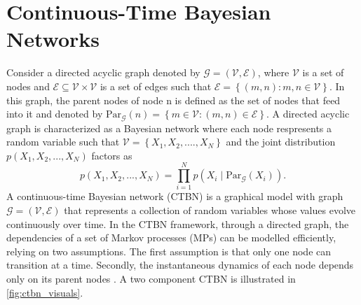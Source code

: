 \section{Continuous-Time Bayesian Networks}
\label{sec:ctbn_intro}
Consider a directed acyclic graph denoted by $ \mathcal{G} = \left( \mathcal{V}, \mathcal{E}\right) $, where $ \mathcal{V} $ is a set of nodes and $ \mathcal{E} \subseteq \mathcal{V} \times \mathcal{V} $ is a set of edges such that $ \mathcal{E} = \left\lbrace \left( m, n\right) : m, n \in \mathcal{V} \right\rbrace $. In this graph, the parent nodes of node n is defined as the set of nodes that feed into it and denoted by $ \mathrm{Par}_{\mathcal{G}}(n) = \left\lbrace m \in \mathcal{V} : \left( m, n \right) \in \mathcal{E} \right\rbrace $. A directed acyclic graph is characterized as a Bayesian network where each node respresents a random variable such that $ \mathcal{V} = \left\lbrace X_1, X_2, ...., X_N\right\rbrace  $ and the joint distribution $ p(X_1, X_2, ..., X_N) $ factors as 
\begin{equation}
p(X_1, X_2, ..., X_N) = \prod_{i=1}^{N} p(X_i \mid \mathrm{Par}_{\mathcal{G}}(X_i)).
\end{equation}
A continuous-time Bayesian network (CTBN) is a graphical model with graph $\mathcal{G} = \left( \mathcal{V}, \mathcal{E}\right) $ that represents a collection of random variables whose values evolve continuously over time. In the CTBN framework, through a directed graph, the dependencies of a set of Markov processes (MPs) can be modelled efficiently, relying on two assumptions. The first assumption is that only one node can transition at a time. Secondly, the instantaneous dynamics of each node depends only on its parent nodes \cite{Cohn2010a, Nodelman1995}. A two component CTBN is illustrated in \autoref{fig:ctbn_visuals}.
